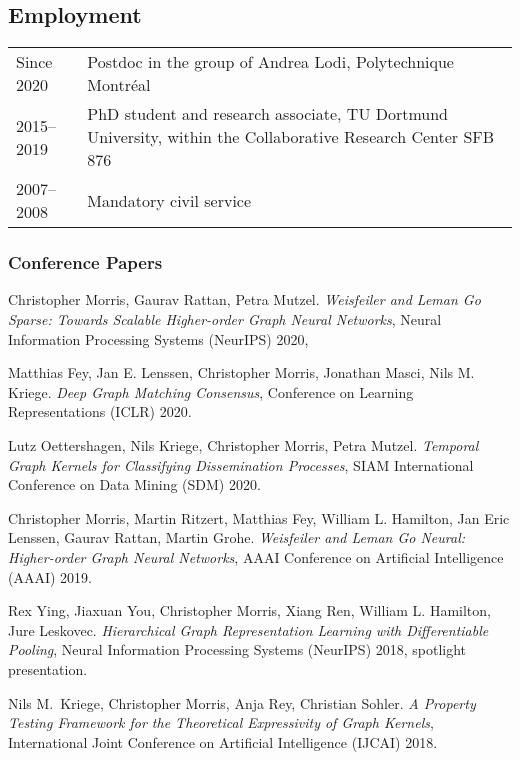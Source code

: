 \documentclass[11pt, a4paper]{scrartcl}
\begin{document}
\subsection*{Employment}
\begin{tabular}{p{2.1cm}p{12.0cm}}
	Since 2020& Postdoc in the group of Andrea Lodi, Polytechnique Montréal\\
	2015--2019&PhD student and research associate, TU Dortmund University, within the Collaborative Research Center SFB 876\\
	2007--2008&Mandatory civil service\\
\end{tabular}

\renewcommand{\refname}{\large\bfseries Publications}

\begin{thebibliography}{5}
\subsubsection*{Conference Papers}
    Christopher Morris, Gaurav Rattan, Petra Mutzel.
\emph{Weisfeiler and Leman Go Sparse: Towards Scalable Higher-order Graph Neural Networks},
Neural Information Processing Systems (NeurIPS) 2020,


	Matthias Fey, Jan E. Lenssen, Christopher Morris, Jonathan Masci, Nils M. Kriege.
    \emph{Deep Graph Matching Consensus},
	Conference on Learning Representations (ICLR) 2020.
	
	Lutz Oettershagen, Nils Kriege, Christopher Morris, Petra Mutzel.
	\emph{Temporal Graph Kernels for Classifying Dissemination Processes},
	SIAM International Conference on Data Mining (SDM) 2020.
	
	Christopher Morris, Martin Ritzert, Matthias Fey, William L. Hamilton, Jan Eric Lenssen, Gaurav Rattan, Martin Grohe.
	\newblock \emph{Weisfeiler and Leman Go Neural: Higher-order Graph Neural Networks},
	\newblock AAAI Conference on Artificial Intelligence (AAAI) 2019.
	
	Rex Ying, Jiaxuan You, Christopher Morris, Xiang Ren, William L. Hamilton, Jure Leskovec.
	\emph{Hierarchical Graph Representation Learning with Differentiable Pooling},
	Neural Information Processing Systems (NeurIPS) 2018, spotlight presentation.
	
	Nils M.~Kriege, Christopher Morris, Anja Rey, Christian Sohler.
	\emph{A Property Testing Framework for the Theoretical Expressivity of Graph Kernels},
	International Joint Conference on Artificial Intelligence (IJCAI) 2018.
	

\end{thebibliography}
\end{document}
